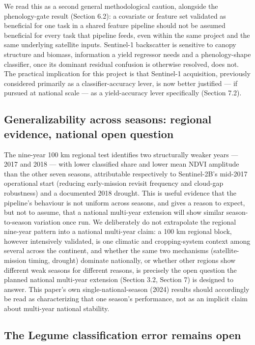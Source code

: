 We read this as a second general methodological caution, alongside the phenology-gate result (Section 6.2): a covariate or feature set validated as beneficial for one task in a shared feature pipeline should not be assumed beneficial for every task that pipeline feeds, even within the same project and the same underlying satellite inputs. Sentinel-1 backscatter is sensitive to canopy structure and biomass, information a yield regressor needs and a phenology-shape classifier, once its dominant residual confusion is otherwise resolved, does not. The practical implication for this project is that Sentinel-1 acquisition, previously considered primarily as a classifier-accuracy lever, is now better justified --- if pursued at national scale --- as a yield-accuracy lever specifically (Section 7.2).

\subsection{Generalizability across seasons: regional evidence, national open question}\label{generalizability-across-seasons-regional-evidence-national-open-question}

The nine-year 100 km regional test identifies two structurally weaker years --- 2017 and 2018 --- with lower classified share and lower mean NDVI amplitude than the other seven seasons, attributable respectively to Sentinel-2B's mid-2017 operational start (reducing early-mission revisit frequency and cloud-gap robustness) and a documented 2018 drought. This is useful evidence that the pipeline's behaviour is not uniform across seasons, and gives a reason to expect, but not to assume, that a national multi-year extension will show similar season-to-season variation once run. We deliberately do not extrapolate the regional nine-year pattern into a national multi-year claim: a 100 km regional block, however intensively validated, is one climatic and cropping-system context among several across the continent, and whether the same two mechanisms (satellite-mission timing, drought) dominate nationally, or whether other regions show different weak seasons for different reasons, is precisely the open question the planned national multi-year extension (Section 3.2, Section 7) is designed to answer. This paper's own single-national-season (2024) results should accordingly be read as characterizing that one season's performance, not as an implicit claim about multi-year national stability.

\subsection{The Legume classification error remains open}\label{the-legume-classification-error-remains-open}

